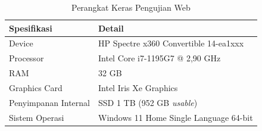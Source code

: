 \begin{table}[h]
\centering
\caption{Perangkat Keras Pengujian Web}
\label{tab:hwt}
\begin{tabular}{|p{5cm}|p{8cm}|}
\hline
\textbf{Spesifikasi} & \textbf{Detail} \\ \hline
Device               & HP Spectre x360 Convertible 14-ea1xxx \\ \hline
Processor            & Intel Core i7-1195G7 @ 2,90 GHz \\ \hline
RAM                  & 32 GB \\ \hline
Graphics Card        & Intel Iris Xe Graphics \\ \hline
Penyimpanan Internal & SSD 1 TB (952 GB \textit{usable}) \\ \hline
Sistem Operasi       & Windows 11 Home Single Language 64-bit \\ \hline
\end{tabular}
\end{table}